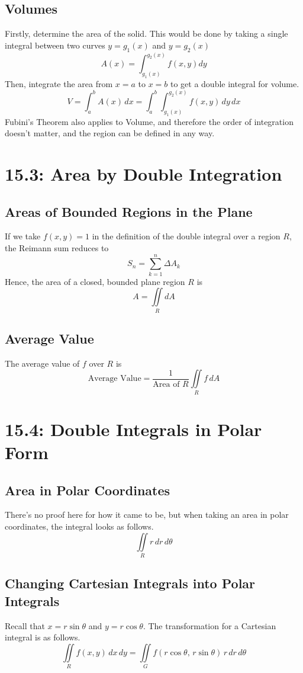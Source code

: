 \documentclass{article}
\begin{document}
\subsection*{Volumes}
Firstly, determine the area of the solid. This would be done by taking a single integral between two curves \(y=g_1(x)\) and \(y=g_2(x)\)
\[A(x)=\int_{g_1(x)}^{g_2(x)}f(x,y)dy\]
Then, integrate the area from \(x=a\) to \(x=b\) to get a double integral for volume.
\[V=\int_{a}^{b}A(x)\,dx=\int_{a}^{b}\int_{g_1(x)}^{g_2(x)}f(x,y)\,dy\,dx\]
Fubini's Theorem also applies to Volume, and therefore the order of integration doesn't matter, and the region can be defined in any way.
\section*{15.3: Area by Double Integration}
\subsection*{Areas of Bounded Regions in the Plane}
If we take \(f(x, y) = 1\) in the definition of the double integral over a region \(R\), the Reimann sum reduces to
\[S_n = \sum_{k=1}^{n}\Delta A_k\]
Hence, the area of a closed, bounded plane region \(R\) is
\[A=\iint\limits_{R}dA\]
\subsection*{Average Value}
The average value of \(f\) over \(R\) is
\[\text{Average Value} = \frac{1}{\text{Area of }R}\iint\limits_Rf\,dA\]
\section*{15.4: Double Integrals in Polar Form}
\subsection*{Area in Polar Coordinates}
There's no proof here for how it came to be, but when taking an area in polar coordinates, the integral looks as follows.
\[\iint\limits_{R}r\,dr\,d\theta\]
\subsection*{Changing Cartesian Integrals into Polar Integrals}
Recall that \(x=r\sin\theta\) and \(y=r\cos\theta\). The transformation for a Cartesian integral is as follows.
\[\iint\limits_{R}f(x, y)\,dx\,dy=\iint\limits_{G}f(r\cos\theta,\, r\sin\theta)\,r\,dr\,d\theta\]
\end{document}

